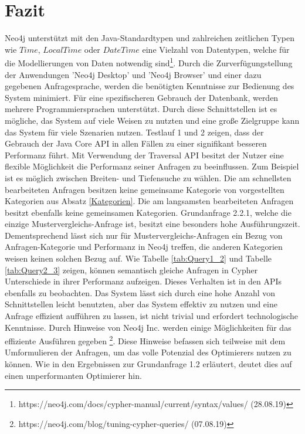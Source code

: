 \section{Fazit}
Neo4j unterstützt mit den Java-Standardtypen und zahlreichen zeitlichen Typen wie $Time$, $LocalTime$ oder $DateTime$ eine Vielzahl von Datentypen, welche für die Modellierungen von Daten notwendig sind\footnote{https://neo4j.com/docs/cypher-manual/current/syntax/values/ (28.08.19)}. Durch die Zurverfügungstellung der Anwendungen 'Neo4j Desktop' und 'Neo4j Browser' und einer dazu gegebenen Anfragesprache, werden die benötigten Kenntnisse zur Bedienung des System minimiert. Für eine spezifischeren Gebrauch der Datenbank, werden mehrere Programmiersprachen unterstützt. Durch diese Schnittstellen ist es mögliche, das System auf viele Weisen zu nutzten und eine große Zielgruppe kann das System für viele Szenarien nutzen. \newline
Testlauf 1 und 2 zeigen, dass der Gebrauch der Java Core API in allen Fällen zu einer signifikant besseren Performanz führt. Mit Verwendung der Traversal API besitzt der Nutzer eine flexible Möglichkeit die Performanz seiner Anfragen zu beeinflussen. Zum Beispiel ist es möglich zwischen Breiten- und Tiefensuche zu wählen. Die am schnellsten bearbeiteten Anfragen besitzen keine gemeinsame Kategorie von vorgestellten Kategorien aus Absatz \ref{Kategorien}. Die am langsamsten bearbeiteten Anfragen besitzt ebenfalls keine gemeinsamen Kategorien. Grundanfrage 2.2.1, welche die einzige Mustervergleichs-Anfrage ist, besitzt eine besonders hohe Ausführungszeit. Dementsprechend lässt sich nur für Mustervergleichs-Anfragen ein Bezug von Anfragen-Kategorie und Performanz in Neo4j treffen, die anderen Kategorien weisen keinen solchen Bezug auf. \newline
Wie Tabelle \ref{tab:Query1_2} und Tabelle \ref{tab:Query2_3} zeigen, können semantisch gleiche Anfragen in Cypher Unterschiede in ihrer Performanz aufzeigen. Dieses Verhalten ist in den APIs ebenfalls zu beobachten. Das System lässt sich durch eine hohe Anzahl von Schnittstellen leicht benutzten, aber das System effektiv zu nutzen und eine Anfrage effizient aufführen zu lassen, ist nicht trivial und erfordert technologische Kenntnisse. Durch Hinweise von Neo4j Inc. werden einige Möglichkeiten für das effiziente Ausführen gegeben \footnote{https://neo4j.com/blog/tuning-cypher-queries/ (07.08.19)}. Diese Hinweise befassen sich teilweise mit dem Umformulieren der Anfragen, um das volle Potenzial des Optimierers nutzen zu können. Wie in den Ergebnissen zur Grundanfrage 1.2 erläutert, deutet dies auf einen unperformanten Optimierer hin. \newline
